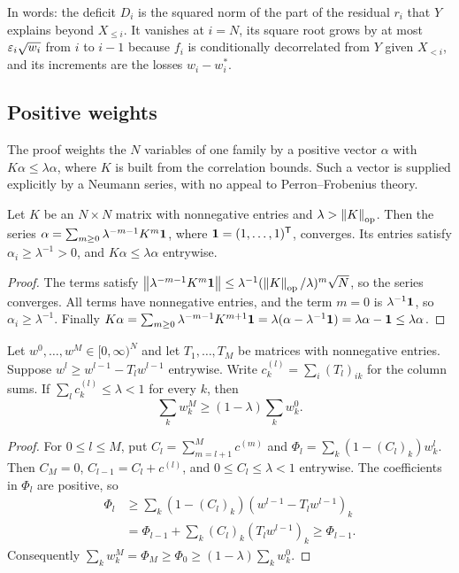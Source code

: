 In words: the deficit $D_i$ is the squared norm of the part of the residual
$r_i$ that $Y$ explains beyond $X_{\le i}$. It vanishes at $i=N$, its square
root grows by
at most $\varepsilon_i\sqrt{w_i}$ from $i$ to $i-1$ because $f_i$ is conditionally
decorrelated from $Y$ given $X_{<i}$, and its increments are the losses
$w_i-w_i^*$.

\subsection{Positive weights}

The proof weights the $N$ variables of one family by a positive
vector $\alpha$ with $K\alpha\le\lambda\alpha$, where $K$ is built
from the correlation bounds. Such a vector is supplied explicitly
by a Neumann series, with no appeal to Perron--Frobenius theory.

\begin{lemma}\label{lem:peyre:weights}
Let $K$ be an $N\times N$ matrix with nonnegative entries and
$\lambda>\left\|K\right\|_{\mathrm{op}}$. Then the series
$\alpha=\sum_{m\ge0}\lambda^{-m-1}K^m\mathbf 1$, where
$\mathbf 1=(1,\dots,1)^{\mathsf T}$, converges. Its entries satisfy
$\alpha_i\ge\lambda^{-1}>0$, and $K\alpha\le\lambda\alpha$ entrywise.
\end{lemma}

\begin{proof}
The terms satisfy
$\left\|\lambda^{-m-1}K^m\mathbf 1\right\|\le\lambda^{-1}(\left\|K\right\|_{\mathrm{op}}/\lambda)^m\sqrt N$, so
the series converges. All terms have nonnegative entries, and the term $m=0$
is $\lambda^{-1}\mathbf 1$, so $\alpha_i\ge\lambda^{-1}$. Finally
$K\alpha=\sum_{m\ge0}\lambda^{-m-1}K^{m+1}\mathbf 1=\lambda(\alpha-\lambda^{-1}\mathbf 1)
=\lambda\alpha-\mathbf 1\le\lambda\alpha$.
\end{proof}

\begin{lemma}\label{lem:peyre:potential}
Let $w^0,\ldots,w^M\in[0,\infty)^N$ and let $T_1,\ldots,T_M$ be matrices
with nonnegative entries. Suppose $w^l\ge w^{l-1}-T_lw^{l-1}$ entrywise.
Write $c_k^{(l)}=\sum_i(T_l)_{ik}$ for the column sums. If
$\sum_lc_k^{(l)}\le\lambda<1$ for every $k$, then
\[
 \sum_kw_k^M\ge(1-\lambda)\sum_kw_k^0.
\]
\end{lemma}

\begin{proof}
For $0\le l\le M$, put $C_l=\sum_{m=l+1}^M c^{(m)}$ and
$\Phi_l=\sum_k(1-(C_l)_k)w_k^l$. Then $C_M=0$, $C_{l-1}=C_l+c^{(l)}$, and
$0\le C_l\le\lambda<1$ entrywise. The coefficients in $\Phi_l$ are positive,
so
\begin{align*}
 \Phi_l
 &\ge\sum_k(1-(C_l)_k)(w^{l-1}-T_lw^{l-1})_k\\
 &=\Phi_{l-1}+\sum_k(C_l)_k(T_lw^{l-1})_k
 \ge\Phi_{l-1}.
\end{align*}
Consequently $\sum_kw_k^M=\Phi_M\ge\Phi_0\ge(1-\lambda)\sum_kw_k^0$.
\end{proof}

